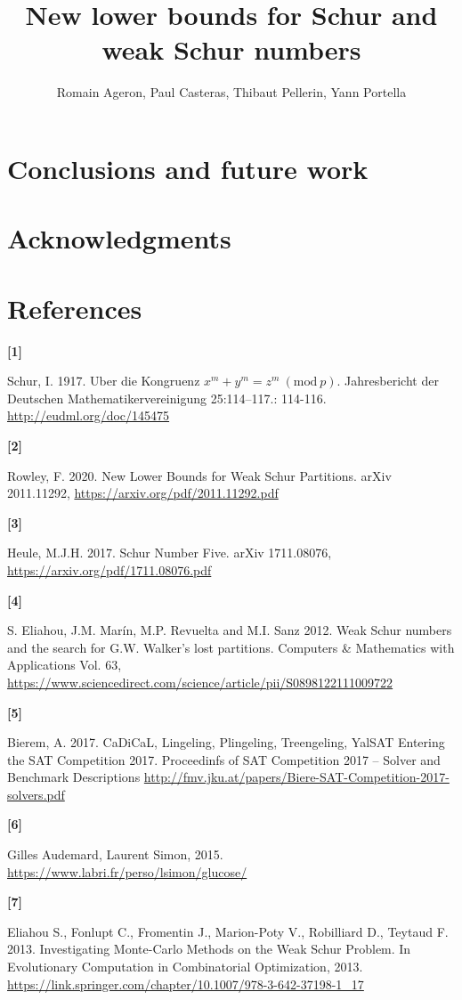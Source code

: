 \documentclass{article}
\title{New lower bounds for Schur and weak Schur numbers}
\author{Romain Ageron, Paul Casteras, Thibaut Pellerin, Yann Portella}
\newtheorem{computational theorem}{Computational Theorem}[section]
\begin{document}
\maketitle










\section{Conclusions and future work}



\section{Acknowledgments}



\section{References}

\hypertarget{label1}{\textbf{[1]}} Schur, I. 1917. Uber die Kongruenz \(x^m + y^m = z^m~(\text{mod}~p)\). Jahresbericht
der
Deutschen Mathematikervereinigung 25:114–117.: 114-116. \url{http://eudml.org/doc/145475}

\hypertarget{label2}{\textbf{[2]}} Rowley, F. 2020. New Lower Bounds for Weak Schur Partitions. arXiv 2011.11292,
\url{https://arxiv.org/pdf/2011.11292.pdf}

\hypertarget{label3}{\textbf{[3]}} Heule, M.J.H. 2017. Schur Number Five. arXiv 1711.08076,
\url{https://arxiv.org/pdf/1711.08076.pdf}

\hypertarget{label4}{\textbf{[4]}} S. Eliahou, J.M. Marín, M.P. Revuelta and M.I. Sanz 2012. Weak Schur numbers and the
search for G.W.
Walker’s lost partitions. Computers \& Mathematics with Applications Vol. 63,
\url{https://www.sciencedirect.com/science/article/pii/S0898122111009722}

\hypertarget{label5}{\textbf{[5]}} Bierem, A. 2017. CaDiCaL, Lingeling, Plingeling, Treengeling, YalSAT Entering the SAT
Competition 2017.
Proceedinfs of SAT Competition 2017 -- Solver and Benchmark Descriptions
\url{http://fmv.jku.at/papers/Biere-SAT-Competition-2017-solvers.pdf}

\hypertarget{label6}{\textbf{[6]}} Gilles Audemard, Laurent Simon, 2015.
\url{https://www.labri.fr/perso/lsimon/glucose/}

\hypertarget{label7}{\textbf{[7]}} Eliahou S., Fonlupt C., Fromentin J., Marion-Poty V., Robilliard D., Teytaud F. 2013.
Investigating Monte-Carlo Methods on the Weak Schur Problem.
In Evolutionary Computation in Combinatorial Optimization, 2013.
\url{https://link.springer.com/chapter/10.1007/978-3-642-37198-1_17}
\end{document}

